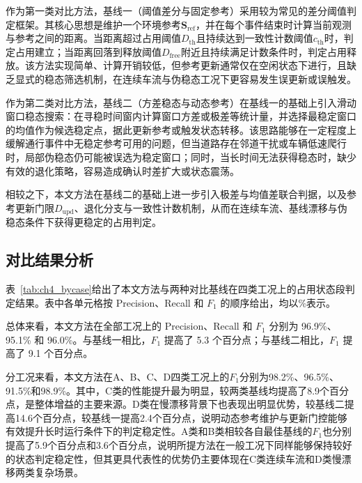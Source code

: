 \documentclass{xdupgthesis}
\begin{document}
作为第一类对比方法，基线一（阈值差分与固定参考）采用较为常见的差分阈值判定框架。其核心思想是维护一个环境参考$\mathbf{S}_{\mathrm{ref}}$，并在每个事件结束时计算当前观测与参考之间的距离。当距离超过占用阈值$D_{\mathrm{th}}$且持续达到一致性计数阈值$c_{\mathrm{th}}$时，判定占用建立；当距离回落到释放阈值$D_{\mathrm{free}}$附近且持续满足计数条件时，判定占用释放。该方法实现简单、计算开销较低，但参考更新通常仅在空闲状态下进行，且缺乏显式的稳态筛选机制，在连续车流与伪稳态工况下更容易发生误更新或误触发。

作为第二类对比方法，基线二（方差稳态与动态参考）在基线一的基础上引入滑动窗口稳态搜索：在寻稳时间窗内计算窗口方差或极差等统计量，并选择最稳定窗口的均值作为候选稳定点，据此更新参考或触发状态转移。该思路能够在一定程度上缓解通行事件中无稳定参考可用的问题，但当道路存在邻道干扰或车辆低速爬行时，局部伪稳态仍可能被误选为稳定窗口；同时，当长时间无法获得稳态时，缺少有效的退化策略，容易造成确认时差扩大或状态震荡。

相较之下，本文方法在基线二的基础上进一步引入极差与均值差联合判据，以及参考更新门限$D_{\mathrm{upd}}$、退化分支与一致性计数机制，从而在连续车流、基线漂移与伪稳态条件下获得更稳定的占用判定。

\subsection{对比结果分析}
\label{subsec:ch4_results}

表~\ref{tab:ch4_bycase}给出了本文方法与两种对比基线在四类工况上的占用状态段判定结果。表中各单元格按 Precision、Recall 和 $F_1$ 的顺序给出，均以\%表示。

总体来看，本文方法在全部工况上的 Precision、Recall 和 $F_1$ 分别为 96.9\%、95.1\% 和 96.0\%。与基线一相比，$F_1$ 提高了 5.3 个百分点；与基线二相比，$F_1$ 提高了 9.1 个百分点。

分工况来看，本文方法在A、B、C、D四类工况上的$F_1$分别为98.2\%、96.5\%、91.5\%和98.9\%。其中，C类的性能提升最为明显，较两类基线均提高了8.9个百分点，是整体增益的主要来源。D类在慢漂移背景下也表现出明显优势，较基线二提高14.6个百分点，较基线一提高2.4个百分点，说明动态参考维护与更新门控能够有效提升长时运行条件下的判定稳定性。A类和B类相较各自最佳基线的$F_1$也分别提高了5.9个百分点和3.6个百分点，说明所提方法在一般工况下同样能够保持较好的状态判定稳定性，但其更具代表性的优势仍主要体现在C类连续车流和D类慢漂移两类复杂场景。
\end{document}
